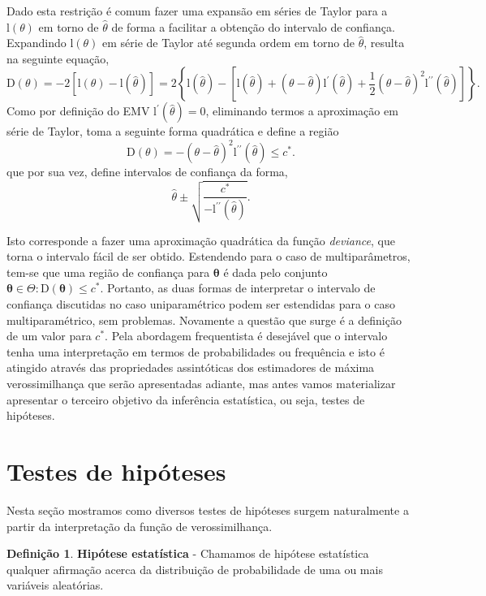 \documentclass[
  9pt,
  a5paper,
]{book}
\theoremstyle{definition}
\newtheorem{definition}{Definição}[chapter]
\theoremstyle{definition}
\theoremstyle{definition}
\theoremstyle{definition}
\theoremstyle{remark}
\begin{document}
Dado esta restrição é comum fazer uma expansão em séries de Taylor para a \(\mathrm{l}(\theta)\) em torno de \(\hat{\theta}\) de forma a facilitar a obtenção do intervalo de confiança. Expandindo \(\mathrm{l}(\theta)\) em série de Taylor até segunda ordem em torno de \(\hat{\theta}\), resulta na seguinte equação,
\[
\mathrm{D}(\theta) = -2[\mathrm{l}(\theta)-\mathrm{l}(\hat{\theta})] = 2 \left\{\mathrm{l}(\hat{\theta}) - [ \mathrm{l}(\hat{\theta}) + (\theta - \hat{\theta})\mathrm{l}^{\prime}(\hat{\theta}) + \frac{1}{2}(\theta - \hat{\theta})^2 \mathrm{l}^{\prime \prime}(\hat{\theta})] \right\} .
\]
Como por definição do EMV \(\mathrm{l}^{\prime}(\hat{\theta}) = 0\), eliminando termos
a aproximação em série de Taylor, toma a seguinte forma quadrática e define a região\\
\[ \mathrm{D}(\theta) =  - (\theta - \hat{\theta})^2 \mathrm{l}^{\prime \prime}(\hat{\theta}) \leq c^*. \]
que por sua vez, define intervalos de confiança da forma,
\[ \hat{\theta} \pm \sqrt{ \frac{c^*}{-\mathrm{l}^{\prime \prime}(\hat{\theta})}}. \]

Isto corresponde a fazer uma aproximação quadrática da função \emph{deviance},
que torna o intervalo fácil de ser obtido. Estendendo para o caso de multiparâmetros, tem-se que uma região de confiança para \(\boldsymbol{\theta}\) é dada pelo conjunto
\({ \boldsymbol{\theta} \in \Theta : \mathrm{D}(\boldsymbol{\theta}) \leq c^*}\).
Portanto, as duas formas de interpretar o intervalo de confiança discutidas no caso uniparamétrico podem ser estendidas para o caso multiparamétrico, sem problemas.
Novamente a questão que surge é a definição de um valor para \(c^*\).
Pela abordagem frequentista é desejável que o intervalo tenha uma interpretação em termos de probabilidades ou frequência e isto é atingido através das propriedades assintóticas dos estimadores de máxima verossimilhança que serão apresentadas adiante, mas antes vamos materializar apresentar o terceiro objetivo da inferência estatística, ou seja, testes de hipóteses.

\hypertarget{testes-de-hipuxf3teses}{%
\section{Testes de hipóteses}\label{testes-de-hipuxf3teses}}

Nesta seção mostramos como diversos testes de hipóteses surgem naturalmente a partir da interpretação da função de verossimilhança.

\begin{definition}
\protect\hypertarget{def:unnamed-chunk-16}{}\label{def:unnamed-chunk-16}\textbf{Hipótese estatística} - Chamamos de hipótese estatística qualquer afirmação acerca da distribuição de probabilidade de uma ou mais variáveis aleatórias.
\end{definition}
\end{document}

